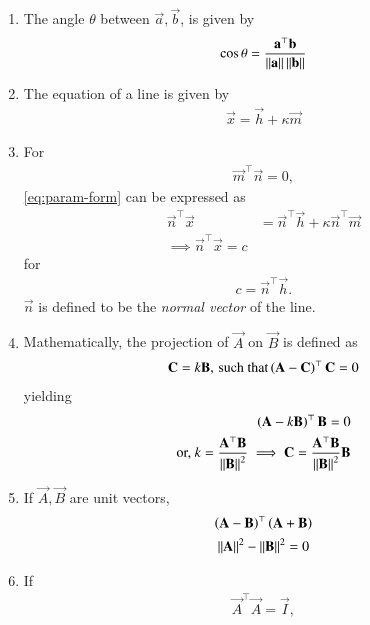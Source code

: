 \begin{enumerate}[label=\thesubsection.\arabic*.,ref=\thesubsection.\theenumi]
	\item The angle $\theta$ between $\vec{a}, \vec{b}$,
		is given by 
\begin{align}
	\label{eq:angle-inner}
		\cos\theta=\frac{{\mathbf{a}^{\top}}{\mathbf{b}}}{\left\lVert\mathbf{a}\right\rVert\left\lVert\mathbf{b}\right\rVert}
\end{align}
\item The equation of a line is given by 
\begin{align}
	\label{eq:param-form}
	\vec{x} = \vec{h} + \kappa \vec{m}
\end{align}
\item 
	For
\begin{align}
	\vec{m}^{\top}\vec{n} = 0,
\end{align}
	\eqref{eq:param-form} can be expressed as
\begin{align}
	\vec{n}^{\top}\vec{x} &= \vec{n}^{\top}\vec{h} + \kappa \vec{n}^{\top}\vec{m}
	\\
	\label{eq:normal-form}
\implies	\vec{n}^{\top}\vec{x} = c
\end{align}
for 
\begin{align}
c = 	\vec{n}^{\top}\vec{h}. 
\end{align}
$\vec{n}$ is defined to be the
{\em normal vector}
		of the line.  
	\item Mathematically, 
the projection of $\vec{A}$ on $\vec{B}$ is defined as
		\begin{align}
	\mathbf{C} = k \mathbf{B},\, \text{such that}
	\left(\mathbf{A}-\mathbf{C}\right)^{\top}\mathbf{C} = 0
\end{align}
yielding
\begin{align}
	\left(\mathbf{A}-k\mathbf{B}\right)^{\top}\mathbf{B} = 0
	\\
	\text{or, } k = 
	\frac{\mathbf{A}^{\top}\mathbf{B}}{\left\lVert\mathbf{B}\right\rVert^2}
	\implies 
	\mathbf{C} = 
	\frac{\mathbf{A}^{\top}\mathbf{B}}{\left\lVert\mathbf{B}\right\rVert^2}
 \mathbf{B}
	\label{eq:12/10/3/4/proj}
\end{align}
\item If $\vec{A}, \vec{B}$ are unit vectors, 
\begin{multline}
	\left(\mathbf{A}-\mathbf{B}\right)^{\top} 
	\left(\mathbf{A}+\mathbf{B}\right) 
	\\
\left\lVert\mathbf{A}\right\rVert^2 - \left\lVert\mathbf{B}\right\rVert^2
	= 0
	\label{eq:12/10/3/11/unit}
\end{multline}
  \item If 
\begin{align}
	\vec{A}^{\top}\vec{A} =\vec{I},
\label{eq:12/10/3/5/inner}

\end{align}
\end{enumerate}
